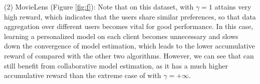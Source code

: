 (2) MovieLens (Figure \ref{fig:f}): 
Note that on this dataset, \modelone{} with $\gamma=1$ attains very high reward, which indicates that the users share similar preferences, so that data aggregation over different users becomes vital for good performance. 
In this case, learning a personalized model on each client becomes unnecessary and slows down the convergence of model estimation, which leads to the lower accumulative reward of \modeltwo{} compared with the other two algorithms.
However, we can see that \modeltwo{} can still benefit from collaborative model estimation, as it has a much higher accumulative reward than the extreme case of \modelone{} with $\gamma=+\infty$.